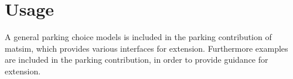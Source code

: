 \section{Usage}
A general parking choice models is included in the parking \gls{contribution} of \gls{matsim}, which provides various interfaces for extension. Furthermore examples are included in the parking contribution, in order to provide guidance for extension. 



